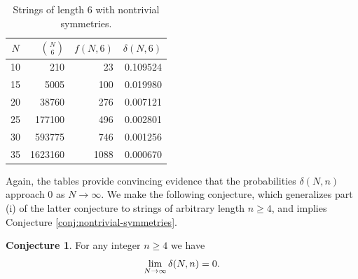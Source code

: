 \documentclass[10pt]{article}
\theoremstyle{definition}
\newtheorem{conjecture}[theorem]{Conjecture}
\numberwithin{equation}{section}
\numberwithin{lemma}{section}
\begin{document}
\begin{table}[H]
\begin{center}
\addtolength{\tabcolsep}{6pt}
\renewcommand{\arraystretch}{1.5}
\begin{tabular}{|c|r|r|r|}
\hline
$N$ & $\binom{N}{6}$ & $f(N,6)$ & $\delta(N,6)$ 
\\
\hline
 10 & 210 & 23 & 0.109524 \\
 15 & 5005 & 100 & 0.019980 \\
 20 & 38760 & 276 & 0.007121 \\
 25 & 177100 & 496 & 0.002801 \\
 30 & 593775 & 746 & 0.001256 \\
 35 & 1623160 & 1088 & 0.000670 \\
\hline
\end{tabular}
\caption{Strings of length $6$ with nontrivial symmetries.
}
\label{table:fN6}
\end{center}
\end{table}

Again, the tables provide convincing evidence that the probabilities 
$\delta(N,n)$ approach $0$ as $N\to\infty$.
We make the following
conjecture, which generalizes part (i) of the latter conjecture to
strings of arbitrary length $n\ge4$, and implies Conjecture 
\ref{conj:nontrivial-symmetries}.

\begin{conjecture}
\label{conj:deltaNn}
For any integer $n\ge 4$ we have
\begin{equation}
\notag
\lim_{N\to\infty} \delta(N,n)=0.
\end{equation}
\end{conjecture}
\end{document}
